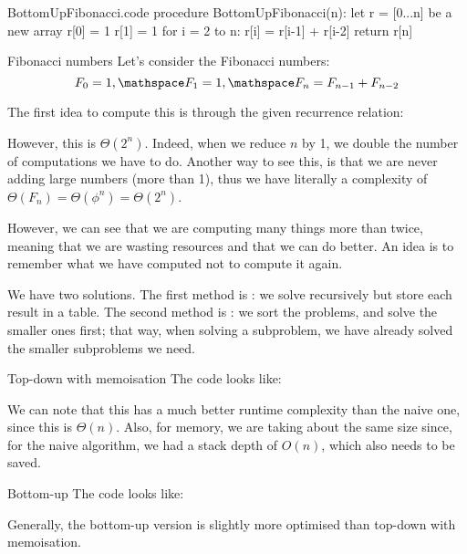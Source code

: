 \documentclass[a4paper]{article}
\begin{document}
\begin{filecontents*}[overwrite]{BottomUpFibonacci.code}
procedure BottomUpFibonacci(n):
    let r = [0...n] be a new array
    r[0] = 1
    r[1] = 1
    for i = 2 to n:
        r[i] = r[i-1] + r[i-2]
    return r[n]
\end{filecontents*}



\begin{parag}{Fibonacci numbers}
    Let's consider the Fibonacci numbers: 
    \[F_0 = 1, \mathspace F_1 = 1, \mathspace F_n = F_{n-1} + F_{n-2}\]
    
    The first idea to compute this is through the given recurrence relation:
    
    However, this is $\Theta\left(2^n\right)$. Indeed, when we reduce $n$ by 1, we double the number of computations we have to do. Another way to see this, is that we are never adding large numbers (more than 1), thus we have literally a complexity of $\Theta\left(F_n\right) = \Theta\left(\phi^n\right) = \Theta\left(2^n\right)$.

    However, we can see that we are computing many things more than twice, meaning that we are wasting resources and that we can do better. An idea is to  remember what we have computed not to compute it again.

    We have two solutions. The first method is : we solve recursively but store each result in a table. The second method is : we sort the problems, and solve the smaller ones first; that way, when solving a subproblem, we have already solved the smaller subproblems we need.


    \begin{subparag}{Top-down with memoisation}
        The code looks like:
        
        We can note that this has a much better runtime complexity than the naive one, since this is $\Theta\left(n\right)$. Also, for memory, we are taking about the same size since, for the naive algorithm, we had a stack depth of $O\left(n\right)$, which also needs to be saved.

    \end{subparag}

    \begin{subparag}{Bottom-up}
        The code looks like:
        
        Generally, the bottom-up version is slightly more optimised than top-down with memoisation.
    \end{subparag}
\end{parag}
\end{document}
